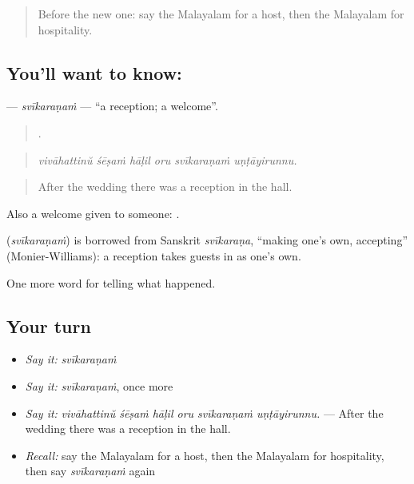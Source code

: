 \label{lesson:ML-C386-svikaranam}



\begin{quote}
Before the new one: say the Malayalam for a host, then the Malayalam for hospitality.
\end{quote}

\subsection*{You'll want to know: }
\textbf{} — \emph{svīkaraṇaṁ} — \textquotedblleft{}a reception; a welcome\textquotedblright{}.

\begin{quote}
     .
\end{quote}

\begin{quote}
\emph{vivāhattinŭ śēṣaṁ hāḷil oru svīkaraṇaṁ uṇṭāyirunnu.}
\end{quote}

\begin{quote}
After the wedding there was a reception in the hall.
\end{quote}

Also a welcome given to someone:    .

\begin{cousinweb}
\textbf{} (\emph{svīkaraṇaṁ}) is borrowed from Sanskrit \emph{svīkaraṇa}, \textquotedblleft{}making one's own, accepting\textquotedblright{} (Monier-Williams): a reception takes guests in as one's own.
\end{cousinweb}

\begin{grammarlens}[title={What you've built}]
One more word for telling what happened.
\end{grammarlens}

\subsection*{Your turn}
\begin{itemize}
\raggedright
  \item \emph{Say it:} \emph{svīkaraṇaṁ}
  \item \emph{Say it:} \emph{svīkaraṇaṁ}, once more
  \item \emph{Say it:} \emph{vivāhattinŭ śēṣaṁ hāḷil oru svīkaraṇaṁ uṇṭāyirunnu.} — After the wedding there was a reception in the hall.
  \item \emph{Recall:} say the Malayalam for a host, then the Malayalam for hospitality, then say \emph{svīkaraṇaṁ} again
\end{itemize}

